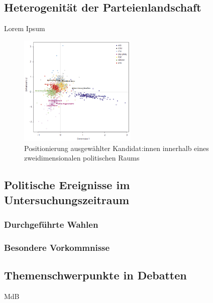 \subsection{Heterogenität der Parteienlandschaft}

Lorem Ipsum

\begin{figure}[H]
    \centering
    \includegraphics[width=0.5\textwidth]{data/images/positionierung_ausgewaehlter_kandidaten.png}
    \caption[Positionierung ausgewählter Kandidat:innen]{Positionierung ausgewählter Kandidat:innen innerhalb eines zweidimensionalen politischen Raums \autocite{saltzer_bundestagswahl_2022}} \label{fig:positionierungAusgewaehlterKanidaten}
\end{figure}

\subsection{Politische Ereignisse im Untersuchungszeitraum}

\subsubsection{Durchgeführte Wahlen}

\subsubsection{Besondere Vorkommnisse} 


\subsection{Themenschwerpunkte in Debatten}


\ac{MdB}

